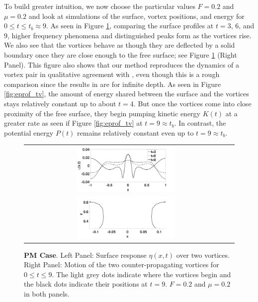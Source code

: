 \documentclass[a4paper,11pt]{article}
\begin{document}
To build greater intuition, we now choose the particular values $F=0.2$ and $\mu=0.2$ and look at simulations of the surface, vortex positions, and energy for $0\leq t \leq t_{b}\approx 9$.  As seen in Figure \ref{fig:surfrepFpt2}, comparing the surface profiles at $t=3$, $6$, and $9$, higher frequency phenomena and distinguished peaks form as the vortices rise.  We also see that the vortices behave as though they are deflected by a solid boundary once they are close enough to the free surface; see Figure \ref{fig:surfrepFpt2} (Right Panel).  This figure also shows that our method reproduces the dynamics of a vortex pair in qualitative agreement with \cite{tryggvason}, even though this is a rough comparison since the results in \cite{tryggvason} are for infinite depth.  As seen in Figure \ref{fig:eprof_tv}, the amount of energy shared between the surface and the vortices stays relatively constant up to about $t=4$.  But once the vortices come into close proximity of the free surface, they begin pumping kinetic energy $K(t)$ at a greater rate as seen if Figure \ref{fig:eprof_tv} at $t=9\approx t_{b}$. In contrast, the potential energy $P(t)$ remains relatively constant even up to $t=9\approx t_{b}$.  
%
\begin{figure}[!h]
\centering
\begin{tabular}{cc}
\includegraphics[width=0.5\textwidth]{surf_resp_mu_pt2_F_pt2} \\
\includegraphics[width=0.5\textwidth]{tracks_F_pt2_tf_9}
\end{tabular}
\caption{\small {\bf PM Case}. Left Panel: Surface response $\eta(x,t)$ over two vortices.  Right Panel: Motion of the two counter-propagating vortices for $0\leq t \leq 9$.  The light grey dots indicate where the vortices begin and the black dots indicate their positions at $t=9$.  $F=0.2$ and $\mu=0.2$ in both panels.}
\label{fig:surfrepFpt2}
\end{figure}
\end{document}
